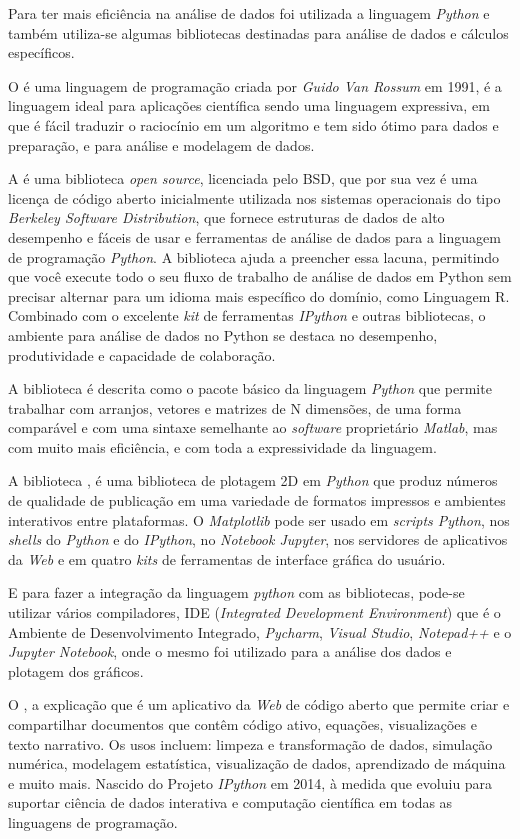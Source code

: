\par Para ter mais eficiência na análise de dados foi utilizada a linguagem \emph{Python} e também utiliza-se algumas bibliotecas destinadas para análise de dados e cálculos específicos.
\par O \emph{ \cite{python}} é uma linguagem de programação criada por \emph{Guido Van Rossum} em 1991,  é a linguagem ideal para aplicações científica sendo uma linguagem expressiva, em que é fácil traduzir o raciocínio em um algoritmo e tem sido ótimo para dados e preparação, e para análise e modelagem de dados.
\par A \cite{pandas}  é uma biblioteca \emph{open source}, licenciada pelo BSD, que por sua vez é uma licença de código aberto inicialmente utilizada nos sistemas operacionais do tipo \emph{Berkeley Software Distribution}, que fornece estruturas de dados de alto desempenho e fáceis de usar e ferramentas de análise de dados para a linguagem de programação \emph{Python}. A biblioteca ajuda a preencher essa lacuna, permitindo que você execute todo o seu fluxo de trabalho de análise de dados em Python sem precisar alternar para um idioma mais específico do domínio, como Linguagem R. Combinado com o excelente \emph{kit} de ferramentas \emph{IPython} e outras bibliotecas, o ambiente para análise de dados no Python se destaca no desempenho, produtividade e capacidade de colaboração. 
\par A biblioteca \cite{numpy} é descrita  como o pacote básico da linguagem \emph{Python} que permite trabalhar com arranjos, vetores e matrizes de N dimensões, de uma forma comparável e com uma sintaxe semelhante ao \emph{software} proprietário \emph{Matlab}, mas com muito mais eficiência, e com toda a expressividade da linguagem.
\par A biblioteca \emph{ \cite{matplotlib}}, é uma biblioteca de plotagem 2D em \emph{Python} que produz números de qualidade de publicação em uma variedade de formatos impressos e ambientes interativos entre plataformas. O \emph{Matplotlib} pode ser usado em \emph{scripts Python}, nos \emph{shells} do \emph{Python} e do \emph{IPython}, no \emph{Notebook Jupyter}, nos servidores de aplicativos da \emph{Web} e em quatro \emph{kits} de ferramentas de interface gráfica do usuário.
\par  E   para fazer a integração da linguagem \emph{python} com as bibliotecas, pode-se utilizar vários compiladores, IDE (\emph{Integrated Development Environment})  que   \'e o  Ambiente de Desenvolvimento Integrado,  \emph{Pycharm}, \emph{Visual Studio}, \emph{Notepad++} e o \emph{Jupyter Notebook}, onde o mesmo foi utilizado para a análise dos dados e plotagem dos gráficos. 
\par O \emph{ \cite{jupyter}}, a explicação que é um aplicativo da \emph{Web} de código aberto que permite criar e compartilhar documentos que contêm código ativo, equações, visualizações e texto narrativo. Os usos incluem: limpeza e transformação de dados, simulação numérica, modelagem estatística, visualização de dados, aprendizado de máquina e muito mais. Nascido do Projeto \emph{IPython} em 2014, à medida que evoluiu para suportar ciência de dados interativa e computação científica em todas as linguagens de programação.   